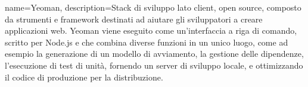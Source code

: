 {
	name=Yeoman,
	description={Stack di sviluppo lato client, open source, composto da strumenti e framework destinati ad aiutare gli sviluppatori a creare applicazioni web. Yeoman viene eseguito come un'interfaccia a riga di comando, scritto per Node.js e che combina diverse funzioni in un unico luogo, come ad esempio la generazione di un modello di avviamento, la gestione delle dipendenze, l'esecuzione di test di unità, fornendo un server di sviluppo locale, e ottimizzando il codice di produzione per la distribuzione.}
}

